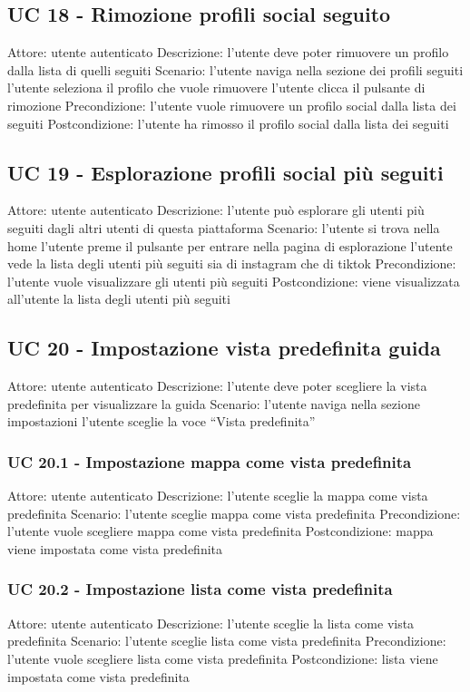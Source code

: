 \subsection{UC 18 - Rimozione profili social seguito}
Attore: utente autenticato
Descrizione: l’utente deve poter rimuovere un profilo dalla lista di quelli seguiti
Scenario:
l’utente naviga nella sezione dei profili seguiti
l’utente seleziona il profilo che vuole rimuovere
l’utente clicca il pulsante di rimozione
Precondizione: l’utente vuole rimuovere un profilo social dalla lista dei seguiti
Postcondizione: l’utente ha rimosso il profilo social dalla lista dei seguiti

\subsection{UC 19 - Esplorazione profili social più seguiti}
Attore: utente autenticato
Descrizione: l’utente può esplorare gli utenti più seguiti dagli altri utenti di questa piattaforma
Scenario: 
l’utente si trova nella home
l’utente preme il pulsante per entrare nella pagina di esplorazione
l’utente vede la lista degli utenti più seguiti sia di instagram che di tiktok
Precondizione: l’utente vuole visualizzare gli utenti più seguiti
Postcondizione: viene visualizzata all’utente la lista degli utenti più seguiti

\subsection{UC 20 - Impostazione vista predefinita guida}
Attore: utente autenticato
Descrizione: l’utente deve poter scegliere la vista predefinita per visualizzare la guida
Scenario: 
l’utente naviga nella sezione impostazioni
l’utente sceglie la voce “Vista predefinita”

\subsubsection{UC 20.1 - Impostazione mappa come vista predefinita}
Attore: utente autenticato
Descrizione: l’utente sceglie la mappa come vista predefinita
Scenario:
l’utente sceglie mappa come vista predefinita
Precondizione: l’utente vuole scegliere mappa come vista predefinita
Postcondizione: mappa viene impostata come vista predefinita

\subsubsection{UC 20.2 - Impostazione lista come vista predefinita}
Attore: utente autenticato
Descrizione: l’utente sceglie la lista come vista predefinita
Scenario:
l’utente sceglie lista come vista predefinita
Precondizione: l’utente vuole scegliere lista come vista predefinita
Postcondizione: lista viene impostata come vista predefinita





